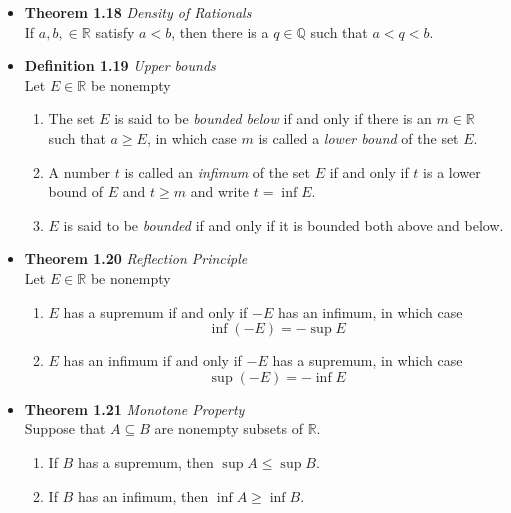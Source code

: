 \documentclass[11pt,a4paper]{article}
\begin{document}
\begin{itemize}
    \item \textbf{Theorem 1.18} \emph{Density of Rationals} \\
        If $a, b, \in \mathbb{R}$ satisfy $a < b$, then there is a $q \in \mathbb{Q}$
        such that $a < q < b$.

    \item \textbf{Definition 1.19} \emph{Upper bounds} \\
        Let $E \in \mathbb{R}$ be nonempty
        \begin{enumerate}
            \item The set $E$ is said to be \emph{bounded below} if and only if there is an
                $m \in \mathbb{R}$ such that $a \geq E$, in which case $m$ is called a
                \emph{lower bound} of the set $E$.
            \item A number $t$ is called an \emph{infimum} of the set $E$ if and only if $t$
                is a lower bound of $E$ and $t \geq m$ and write $t = \inf E$.
            \item $E$ is said to be \emph{bounded} if and only if it is bounded both above and
                below.
        \end{enumerate}

    \item \textbf{Theorem 1.20} \emph{Reflection Principle} \\
        Let $E \in \mathbb{R}$ be nonempty
        \begin{enumerate}
            \item $E$ has a supremum if and only if $-E$ has an infimum, in which case
                \[
                    \inf (-E) = -\sup E
                \]
            \item $E$ has an infimum if and only if $-E$ has a supremum, in which case
                \[
                    \sup (-E) = -\inf E
                \]
        \end{enumerate}

    \item \textbf{Theorem 1.21} \emph{Monotone Property} \\
        Suppose that $A \subseteq B$ are nonempty subsets of $\mathbb{R}$.
        \begin{enumerate}
            \item If $B$ has a supremum, then $\sup A \leq \sup B$.
            \item If $B$ has an infimum, then $\inf A \geq \inf B$.
        \end{enumerate}

\end{itemize}
\end{document}
